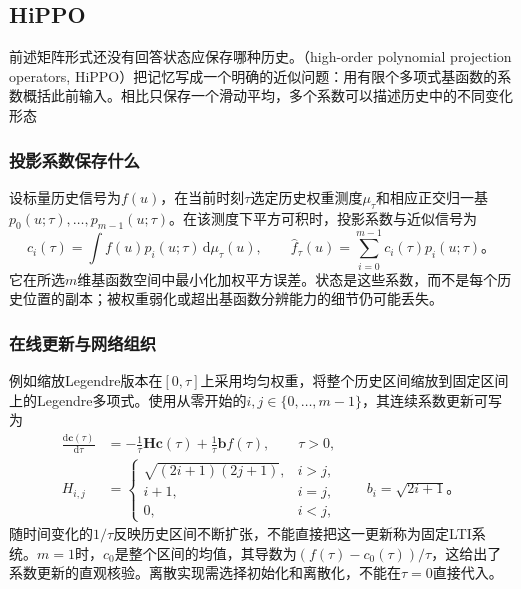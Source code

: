 \subsection{HiPPO}
\label{sec:rnn-hippo}

前述矩阵形式还没有回答状态应保存哪种历史。（high-order polynomial projection operators, HiPPO）把记忆写成一个明确的近似问题：用有限个多项式基函数的系数概括此前输入。相比只保存一个滑动平均，多个系数可以描述历史中的不同变化形态

\subsubsection{投影系数保存什么}
\label{sec:rnn-hippo-memory}

设标量历史信号为$f(u)$，在当前时刻$\tau$选定历史权重测度$\mu_\tau$和相应正交归一基$p_0(u;\tau),\ldots,p_{m-1}(u;\tau)$。在该测度下平方可积时，投影系数与近似信号为
\begin{equation}
  c_i(\tau)=\int f(u)p_i(u;\tau)\,\mathrm{d}\mu_\tau(u),
  \qquad
  \widehat f_\tau(u)=\sum_{i=0}^{m-1}c_i(\tau)p_i(u;\tau)\text{。}
  \label{eq:rnn-hippo-projection}
\end{equation}
它在所选$m$维基函数空间中最小化加权平方误差。状态是这些系数，而不是每个历史位置的副本；被权重弱化或超出基函数分辨能力的细节仍可能丢失。

\subsubsection{在线更新与网络组织}
\label{sec:rnn-hippo-architecture}

例如缩放Legendre版本在$[0,\tau]$上采用均匀权重，将整个历史区间缩放到固定区间上的Legendre多项式。使用从零开始的$i,j\in\{0,\ldots,m-1\}$，其连续系数更新可写为
\begin{equation}
  \begin{aligned}
    \frac{\mathrm{d}\bm{c}(\tau)}{\mathrm{d}\tau}
      &=-\frac{1}{\tau}\bm{H}\bm{c}(\tau)
        +\frac{1}{\tau}\bm{b}f(\tau),\qquad \tau>0,\\
    H_{i,j}&=
      \begin{cases}
        \sqrt{(2i+1)(2j+1)},&i>j,\\
        i+1,&i=j,\\
        0,&i<j,
      \end{cases}
      \qquad b_i=\sqrt{2i+1}\text{。}
  \end{aligned}
  \label{eq:rnn-hippo-legs}
\end{equation}
随时间变化的$1/\tau$反映历史区间不断扩张，不能直接把这一更新称为固定LTI系统。$m=1$时，$c_0$是整个区间的均值，其导数为$(f(\tau)-c_0(\tau))/\tau$，这给出了系数更新的直观核验。离散实现需选择初始化和离散化，不能在$\tau=0$直接代入。

